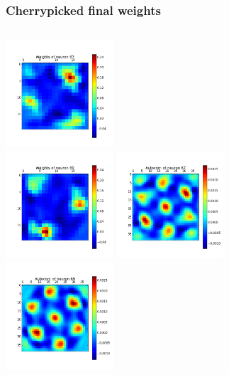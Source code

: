 \begin{frame}
\frametitle{Cherrypicked final weights}
\begin{columns}[t]
\centering
\includegraphics[width=4cm,height=4cm]{neurons/neuron_w_67.png}\\
\includegraphics[width=4cm,height=4cm]{neurons/neuron_w_69.png}
\centering
\includegraphics[width=4cm,height=4cm]{neurons/neuron_a_67.png}\\
\includegraphics[width=4cm,height=4cm]{neurons/neuron_a_69.png}
\end{columns}
\end{frame}

